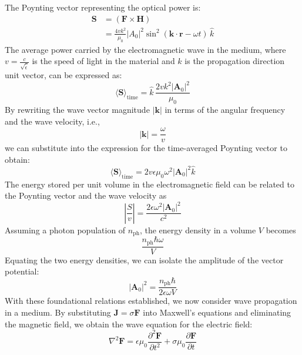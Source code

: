 The Poynting vector representing the optical power is:
\begin{align}
	\mathbf{S} & = (\mathbf{F} \times \mathbf{H})                                                                       \\
	           & = \frac{4 v k^2}{\mu_0} \left| A_0 \right|^2 \sin^2(\mathbf{k} \cdot \mathbf{r} - \omega t) \, \hat{k}
\end{align}
The average power carried by the electromagnetic wave in the medium, where \( v = \frac{c}{\sqrt{\tilde{\epsilon}}} \) is the speed of light in the material and \( \hat{k} \) is the propagation direction unit vector, can be expressed as:
\begin{equation}
	\langle \mathbf{S} \rangle_{\text{time}} = \hat{k} \, \frac{2 v k^2 |\mathbf{A}_0|^2}{\mu_0}
\end{equation}
By rewriting the wave vector magnitude \( |\mathbf{k}| \) in terms of the angular frequency and the wave velocity, i.e.,
\begin{equation}
	|\mathbf{k}| = \frac{\omega}{v}
\end{equation}
we can substitute into the expression for the time-averaged Poynting vector to obtain:
\begin{equation}
	\langle \mathbf{S} \rangle_{\text{time}} = 2 v \epsilon \mu_0 \omega^2 |\mathbf{A}_0|^2 \hat{k}
\end{equation}
The energy stored per unit volume in the electromagnetic field can be related to the Poynting vector and the wave velocity as
\begin{equation}
	\left| \frac{S}{v} \right| = \frac{2 \epsilon \omega^2 |\mathbf{A}_0|^2}{c^2}
\end{equation}
Assuming a photon population of \( n_{\text{ph}} \), the energy density in a volume \( V \) becomes
\begin{equation}
	\frac{n_{\text{ph}} \hbar \omega}{V}
\end{equation}
Equating the two energy densities, we can isolate the amplitude of the vector potential:
\begin{equation}
	|\mathbf{A}_0|^2 = \frac{n_{\text{ph}} \hbar}{2 \epsilon \omega V}
\end{equation}
With these foundational relations established, we now consider wave propagation in a medium. By substituting \( \mathbf{J} = \sigma \mathbf{F} \) into Maxwell's equations and eliminating the magnetic field, we obtain the wave equation for the electric field:
\begin{equation}
	\nabla^2 \mathbf{F} = \epsilon \mu_0 \frac{\partial^2 \mathbf{F}}{\partial t^2} + \sigma \mu_0 \frac{\partial \mathbf{F}}{\partial t}
\end{equation}

